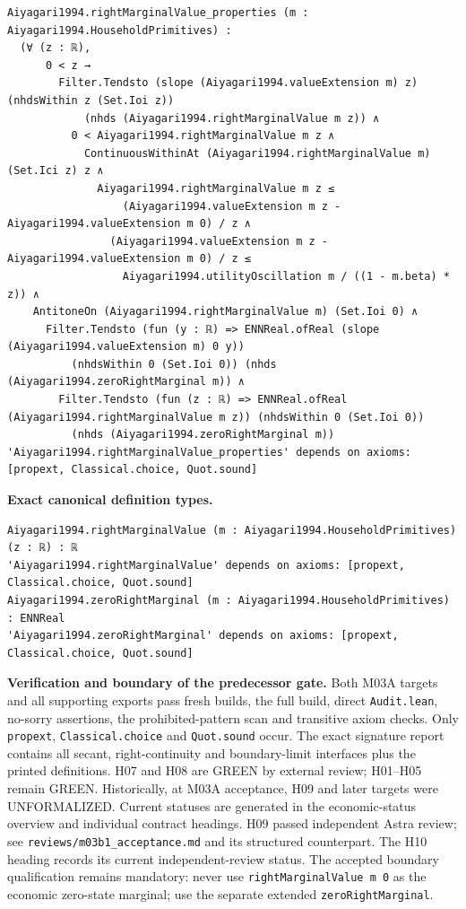 \documentclass[
  11pt,
]{article}
\let\LedgerOriginalTexttt\texttt
\renewcommand{\texttt}[1]{{\small\LedgerOriginalTexttt{#1}}}
\begin{document}
\begin{verbatim}
Aiyagari1994.rightMarginalValue_properties (m : Aiyagari1994.HouseholdPrimitives) :
  (∀ (z : ℝ),
      0 < z →
        Filter.Tendsto (slope (Aiyagari1994.valueExtension m) z) (nhdsWithin z (Set.Ioi z))
            (nhds (Aiyagari1994.rightMarginalValue m z)) ∧
          0 < Aiyagari1994.rightMarginalValue m z ∧
            ContinuousWithinAt (Aiyagari1994.rightMarginalValue m) (Set.Ici z) z ∧
              Aiyagari1994.rightMarginalValue m z ≤
                  (Aiyagari1994.valueExtension m z - Aiyagari1994.valueExtension m 0) / z ∧
                (Aiyagari1994.valueExtension m z - Aiyagari1994.valueExtension m 0) / z ≤
                  Aiyagari1994.utilityOscillation m / ((1 - m.beta) * z)) ∧
    AntitoneOn (Aiyagari1994.rightMarginalValue m) (Set.Ioi 0) ∧
      Filter.Tendsto (fun (y : ℝ) => ENNReal.ofReal (slope (Aiyagari1994.valueExtension m) 0 y))
          (nhdsWithin 0 (Set.Ioi 0)) (nhds (Aiyagari1994.zeroRightMarginal m)) ∧
        Filter.Tendsto (fun (z : ℝ) => ENNReal.ofReal (Aiyagari1994.rightMarginalValue m z)) (nhdsWithin 0 (Set.Ioi 0))
          (nhds (Aiyagari1994.zeroRightMarginal m))
'Aiyagari1994.rightMarginalValue_properties' depends on axioms: [propext, Classical.choice, Quot.sound]
\end{verbatim}

\textbf{Exact canonical definition types.}

\begin{verbatim}
Aiyagari1994.rightMarginalValue (m : Aiyagari1994.HouseholdPrimitives) (z : ℝ) : ℝ
'Aiyagari1994.rightMarginalValue' depends on axioms: [propext, Classical.choice, Quot.sound]
Aiyagari1994.zeroRightMarginal (m : Aiyagari1994.HouseholdPrimitives) : ENNReal
'Aiyagari1994.zeroRightMarginal' depends on axioms: [propext, Classical.choice, Quot.sound]
\end{verbatim}

\textbf{Verification and boundary of the predecessor gate.} Both M03A
targets and all supporting exports pass fresh builds, the full build,
direct \texttt{Audit.lean}, no-sorry assertions, the prohibited-pattern
scan and transitive axiom checks. Only \texttt{propext},
\texttt{Classical.choice} and \texttt{Quot.sound} occur. The exact
signature report contains all secant, right-continuity and
boundary-limit interfaces plus the printed definitions. H07 and H08 are
GREEN by external review; H01--H05 remain GREEN. Historically, at M03A
acceptance, H09 and later targets were UNFORMALIZED. Current statuses
are generated in the economic-status overview and individual contract
headings. H09 passed independent Astra review; see
\texttt{reviews/m03b1\_acceptance.md} and its structured counterpart.
The H10 heading records its current independent-review status. The
accepted boundary qualification remains mandatory: never use
\texttt{rightMarginalValue\ m\ 0} as the economic zero-state marginal;
use the separate extended \texttt{zeroRightMarginal}.
\end{document}
